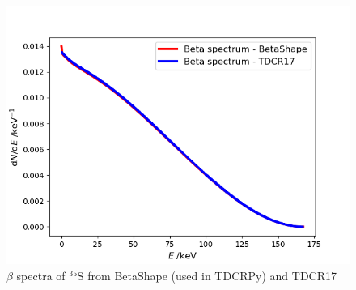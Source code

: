 \documentclass[12pt]{iopart}
\begin{document}
\begin{figure}[h!]
\centering
\includegraphics[scale=0.4]{../decayData/spectra/BetaSpectrum_S-35.png}
\caption{$\beta$ spectra of $^{35}$S from BetaShape (used in TDCRPy) and TDCR17}
\label{fig:S-35}
\end{figure}
\end{document}
